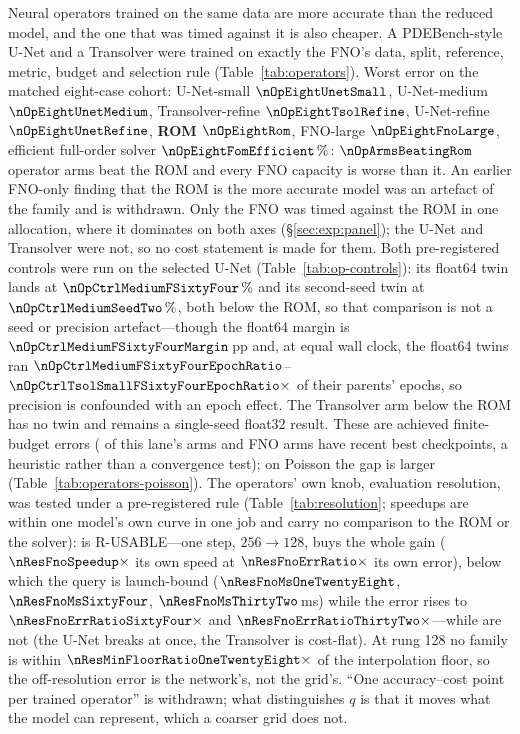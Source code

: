 Neural operators trained on the same data are more accurate than the reduced
model, and the one that was timed against it is also cheaper. A PDEBench-style
U-Net and a Transolver were trained on exactly the FNO's data,
split, reference, metric, budget and selection rule (Table~\ref{tab:operators}). Worst error on the matched eight-case cohort:
U-Net-small $\nOpEightUnetSmall$, U-Net-medium $\nOpEightUnetMedium$,
Transolver-refine $\nOpEightTsolRefine$, U-Net-refine $\nOpEightUnetRefine$,
\textbf{ROM $\nOpEightRom$}, FNO-large $\nOpEightFnoLarge$, efficient full-order
solver $\nOpEightFomEfficient\,\%$: $\nOpArmsBeatingRom$ operator arms beat the
ROM and every FNO capacity is worse than it. An earlier FNO-only finding that the ROM is the more accurate model was an
artefact of the family and is withdrawn. Only the FNO was timed against the ROM
in one allocation, where it dominates on both axes (\S\ref{sec:exp:panel}); the
U-Net and Transolver were not, so no cost statement is made for them. Both pre-registered controls were run on the selected U-Net
(Table~\ref{tab:op-controls}): its float64 twin lands at
$\nOpCtrlMediumFSixtyFour\,\%$ and its second-seed twin at
$\nOpCtrlMediumSeedTwo\,\%$, both below the ROM, so that comparison is not a seed
or precision artefact---though the float64 margin is
$\nOpCtrlMediumFSixtyFourMargin$\,pp and, at equal wall clock, the float64 twins
ran $\nOpCtrlMediumFSixtyFourEpochRatio$--$\nOpCtrlTsolSmallFSixtyFourEpochRatio\times$
of their parents' epochs, so precision is confounded with an epoch effect. The
Transolver arm below the ROM has no twin and remains a single-seed float32
result. These are achieved finite-budget errors (\nOpLaneImproving{} of this
lane's arms and \nOpFnoImproving{} FNO arms have recent best checkpoints,
a heuristic rather than a convergence test); on Poisson the gap is larger
(Table~\ref{tab:operators-poisson}).
The operators' own knob, evaluation resolution, was tested under a
pre-registered rule (Table~\ref{tab:resolution}; speedups are within one
model's own curve in one job and carry no comparison to the ROM or the solver):
\nResUsableList{} is R-USABLE---one step, $256\to128$, buys the whole gain
($\nResFnoSpeedup\times$ its own speed at $\nResFnoErrRatio\times$ its own
error), below which the query is launch-bound ($\nResFnoMsOneTwentyEight$,
$\nResFnoMsSixtyFour$, $\nResFnoMsThirtyTwo$\,ms) while the error rises to
$\nResFnoErrRatioSixtyFour\times$ and $\nResFnoErrRatioThirtyTwo\times$---while
\nResDegenerateList{} are not (the U-Net breaks at once, the Transolver is
cost-flat). At rung 128 no family is within
$\nResMinFloorRatioOneTwentyEight\times$ of the interpolation floor, so the
off-resolution error is the network's, not the grid's. ``One accuracy--cost
point per trained operator'' is withdrawn; what distinguishes $q$ is that it
moves what the model can represent, which a coarser grid does not.
